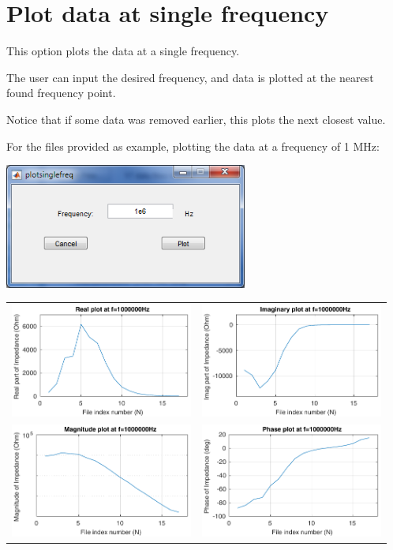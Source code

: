 \documentclass[10pt,b5paper,oneside]{book}
\begin{document}
\section{Plot data at single frequency}

This option plots the data at a single frequency.

The user can input the desired frequency, and data is plotted at the nearest found frequency point.

Notice that if some data was removed earlier, this plots the next closest value.

For the files provided as example, plotting the data at a frequency of 1 MHz:

\includegraphics[width=8cm]{plotfreqdialog.png}

\begin{tabular}{cc}
	\includegraphics[width=6cm]{plotfreqa.pdf} & \includegraphics[width=6cm]{plotfreqb.pdf} \\
	\includegraphics[width=6cm]{plotfreqc.pdf} & \includegraphics[width=6cm]{plotfreqd.pdf} \\
\end{tabular}
\end{document}
